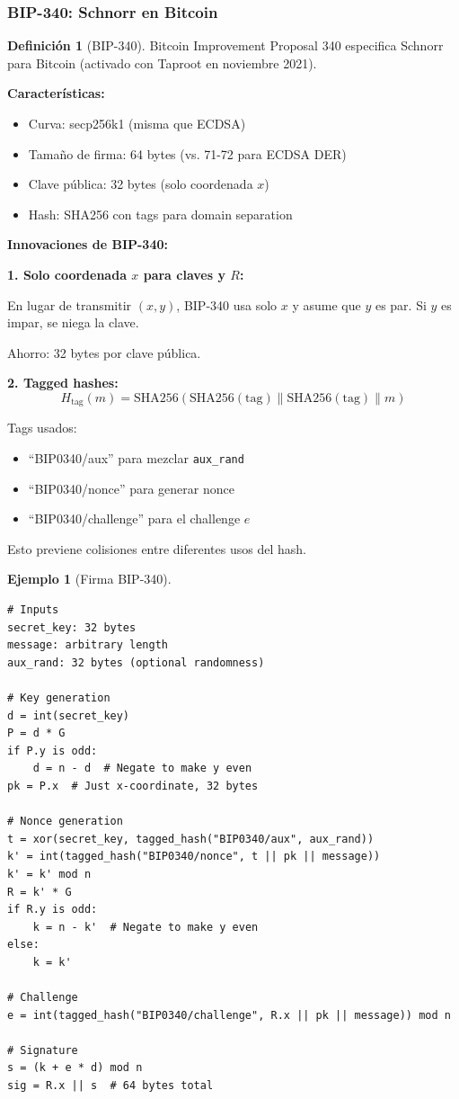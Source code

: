 \documentclass[11pt,a4paper,twoside,openright]{book}
\theoremstyle{definition}
\newtheorem{definition}{Definición}[chapter]
\newtheorem{example}{Ejemplo}[chapter]
\theoremstyle{plain}
\theoremstyle{remark}
\begin{document}
\subsubsection{BIP-340: Schnorr en Bitcoin}

\begin{definition}[BIP-340]
Bitcoin Improvement Proposal 340 especifica Schnorr para Bitcoin (activado con Taproot en noviembre 2021).

\textbf{Características:}
\begin{itemize}
    \item Curva: secp256k1 (misma que ECDSA)
    \item Tamaño de firma: 64 bytes (vs. 71-72 para ECDSA DER)
    \item Clave pública: 32 bytes (solo coordenada $x$)
    \item Hash: SHA256 con tags para domain separation
\end{itemize}
\end{definition}

\begin{mathnote}
\textbf{Innovaciones de BIP-340:}

\textbf{1. Solo coordenada $x$ para claves y $R$:}

En lugar de transmitir $(x, y)$, BIP-340 usa solo $x$ y asume que $y$ es par. Si $y$ es impar, se niega la clave.

Ahorro: 32 bytes por clave pública.

\textbf{2. Tagged hashes:}
\[ H_{\text{tag}}(m) = \text{SHA256}(\text{SHA256}(\text{tag}) \| \text{SHA256}(\text{tag}) \| m) \]

Tags usados:
\begin{itemize}
    \item ``BIP0340/aux'' para mezclar \texttt{aux\_rand}
    \item ``BIP0340/nonce'' para generar nonce
    \item ``BIP0340/challenge'' para el challenge $e$
\end{itemize}

Esto previene colisiones entre diferentes usos del hash.
\end{mathnote}

\begin{example}[Firma BIP-340]
\begin{verbatim}
# Inputs
secret_key: 32 bytes
message: arbitrary length
aux_rand: 32 bytes (optional randomness)

# Key generation
d = int(secret_key)
P = d * G
if P.y is odd:
    d = n - d  # Negate to make y even
pk = P.x  # Just x-coordinate, 32 bytes

# Nonce generation
t = xor(secret_key, tagged_hash("BIP0340/aux", aux_rand))
k' = int(tagged_hash("BIP0340/nonce", t || pk || message))
k' = k' mod n
R = k' * G
if R.y is odd:
    k = n - k'  # Negate to make y even
else:
    k = k'

# Challenge
e = int(tagged_hash("BIP0340/challenge", R.x || pk || message)) mod n

# Signature
s = (k + e * d) mod n
sig = R.x || s  # 64 bytes total
\end{verbatim}
\end{example}
\end{document}
